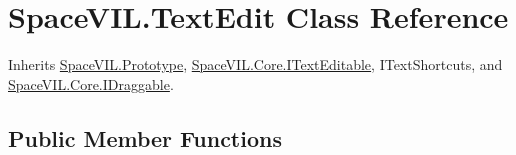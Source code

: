 \hypertarget{class_space_v_i_l_1_1_text_edit}{}\section{Space\+V\+I\+L.\+Text\+Edit Class Reference}
\label{class_space_v_i_l_1_1_text_edit}


Inherits \mbox{\hyperlink{class_space_v_i_l_1_1_prototype}{Space\+V\+I\+L.\+Prototype}}, \mbox{\hyperlink{interface_space_v_i_l_1_1_core_1_1_i_text_editable}{Space\+V\+I\+L.\+Core.\+I\+Text\+Editable}}, I\+Text\+Shortcuts, and \mbox{\hyperlink{interface_space_v_i_l_1_1_core_1_1_i_draggable}{Space\+V\+I\+L.\+Core.\+I\+Draggable}}.

\subsection*{Public Member Functions}
